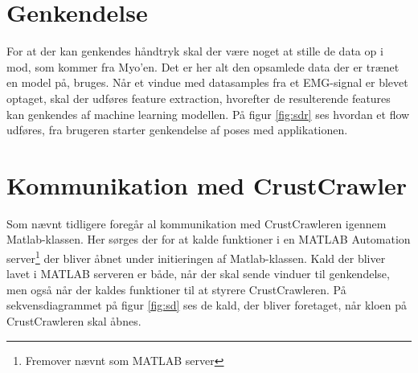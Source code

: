 \section{Genkendelse}
For at der kan genkendes håndtryk skal der være noget at stille de data op i mod, som kommer fra Myo'en. Det er her alt den opsamlede data der er trænet en model på, bruges. Når et vindue med datasamples fra et EMG-signal er blevet optaget, skal der udføres feature extraction, hvorefter de resulterende features kan genkendes af machine learning modellen. På figur \ref{fig:sdr} ses hvordan et flow udføres, fra brugeren starter genkendelse af poses med applikationen.



\section{Kommunikation med CrustCrawler}
\label{sec:ktc}
Som nævnt tidligere foregår al kommunikation med CrustCrawleren igennem Matlab-klassen. Her sørges der for at kalde funktioner i en MATLAB Automation server\footnote{Fremover nævnt som MATLAB server} der bliver åbnet under initieringen af Matlab-klassen. Kald der bliver lavet i MATLAB serveren er både, når der skal sende vinduer til genkendelse, men også når der kaldes funktioner til at styrere CrustCrawleren. På sekvensdiagrammet på figur \ref{fig:sd} ses de kald, der bliver foretaget, når kloen på CrustCrawleren skal åbnes.

